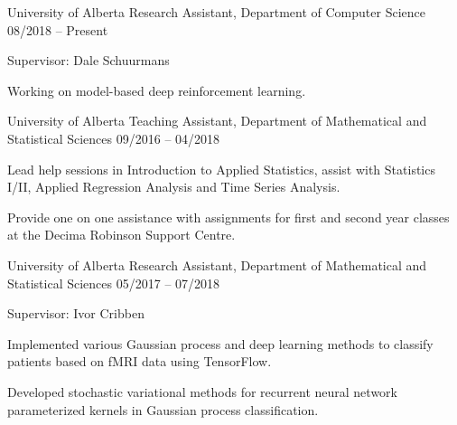 \begin{cventries}
\cventry
    {University of Alberta}
    {Research Assistant, Department of Computer Science}
    {08/2018 -- Present}
    {
      \begin{cvitems}
      \item Supervisor: Dale Schuurmans 
      \item Working on model-based deep reinforcement learning.
      \end{cvitems}
    }


  \cventry
    {University of Alberta}
    {Teaching Assistant, Department of Mathematical and Statistical Sciences} {09/2016 -- 04/2018}
    {
      \begin{cvitems}
        \item Lead help sessions in Introduction to Applied Statistics, assist with Statistics I/II, Applied Regression Analysis and Time Series Analysis.
        \item Provide one on one assistance with assignments for first and second year classes at the Decima Robinson Support Centre.
      \end{cvitems}
    }
\cventry
    {University of Alberta}
    {Research Assistant, Department of Mathematical and Statistical Sciences}    {05/2017 -- 07/2018}
    {
      \begin{cvitems}
        \item Supervisor: Ivor Cribben
        \item Implemented various Gaussian process and deep learning methods to classify patients based on fMRI data using TensorFlow.
        \item Developed stochastic variational methods for recurrent neural network parameterized kernels in Gaussian process classification.
      \end{cvitems}
    }

\end{cventries}
